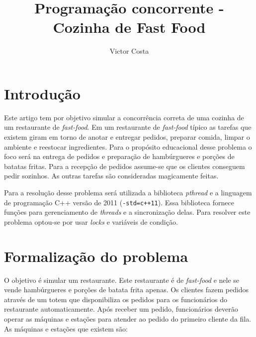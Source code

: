 \documentclass[a4paper]{article}
\title{Programação concorrente - Cozinha de Fast Food}
\author{Victor Costa}
\begin{document}
\maketitle

\section{Introdução}
\label{sec:introduction}

Este artigo tem por objetivo simular a concorrência correta de uma cozinha de um restaurante de \textit{fast-food}. Em um restaurante de \textit{fast-food} típico as tarefas que existem giram em torno de anotar e entregar pedidos, preparar comida, limpar o ambiente e reestocar ingredientes. Para o propósito educacional desse problema o foco será na entrega de pedidos e preparação de hambúrgueres e porções de batatas fritas. Para a recepção de pedidos assume-se que os clientes conseguem pedir sozinhos. As outras tarefas são consideradas magicamente feitas.

Para a resolução desse problema será utilizada a biblioteca \textit{pthread} e a linguagem de programação C++ versão de 2011 (\texttt{-std=c++11}). Essa biblioteca fornece funções para gerenciamento de \textit{threads} e a sincronização delas. Para resolver este problema optou-se por usar \textit{locks} e variáveis de condição.

\section{Formalização do problema}
\label{sec:definingTheProblem}

O objetivo é simular um restaurante. Este restaurante é de \textit{fast-food} e nele se vende hambúrgueres e porções de batata frita apenas. Os clientes fazem pedidos através de um totem que disponibiliza os pedidos para os funcionários do restaurante automaticamente. Após receber um pedido, funcionários deverão operar as máquinas e estações para atender ao pedido do primeiro cliente da fila. As máquinas e estações que existem são:
\end{document}
